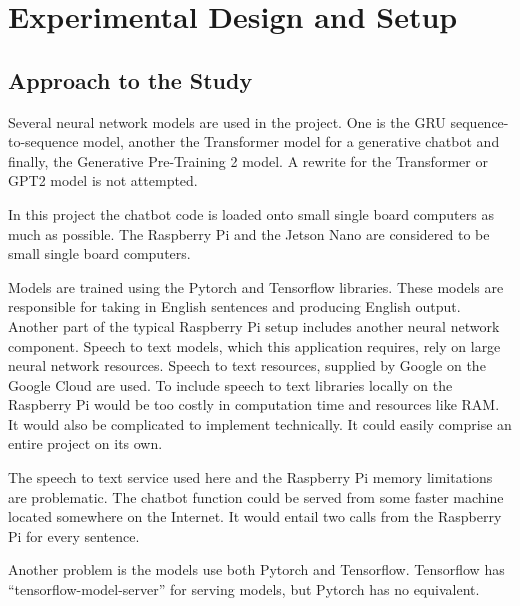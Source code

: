 \chapter{Experimental Design and Setup}

\label{chapter-approach-to-study}

\section{Approach to the Study}

Several neural network models are used in the project. One is the GRU sequence-to-sequence model, another the Transformer model for a generative chatbot and finally, the Generative Pre-Training 2 model. A rewrite for the Transformer or GPT2 model is not attempted.

In this project the chatbot code is loaded onto small single board computers as much as possible. The Raspberry Pi and the Jetson Nano are considered to be small single board computers.

Models are trained using the Pytorch and Tensorflow libraries. These models are responsible for taking in English sentences and producing English output. Another part of the typical Raspberry Pi setup includes another neural network component. Speech to text models, which this application requires, rely on large neural network resources. Speech to text resources, supplied by Google on the Google Cloud are used. To include speech to text libraries locally on the Raspberry Pi would be too costly in computation time and resources like RAM. It would also be complicated to implement technically. It could easily comprise an entire project on its own.


The speech to text service used here and the Raspberry Pi memory limitations are problematic. The chatbot function could be served from some faster machine located somewhere on the Internet. It would entail two calls from the Raspberry Pi for every sentence.%

Another problem is the models use both Pytorch and Tensorflow. Tensorflow has ``tensorflow-model-server'' for serving models, but Pytorch has no equivalent. %

